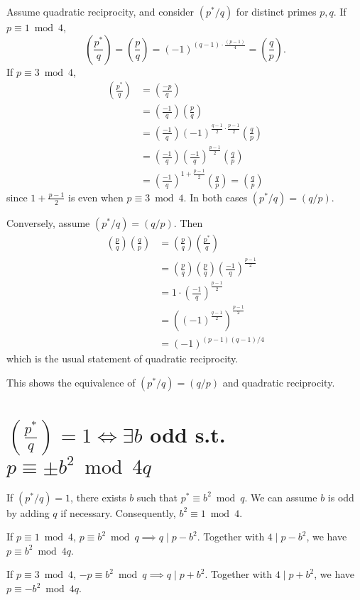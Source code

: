 \documentclass[b5paper,12pt,oneside,openright]{memoir}
\newcommand{\jacobi}[2]{\left(\frac{#1}{#2}\right)}
\begin{document}
Assume quadratic reciprocity, and consider $(p^*/q)$ for distinct primes $p, q$. If $p\equiv 1\bmod 4$,
\[\jacobi{p^*}{q} = \jacobi{p}{q} = (-1)^{(q-1)\cdot\frac{(p-1)}{4}} = \jacobi{q}{p}.\]
If $p\equiv 3\bmod 4$,
\begin{align*}
  \jacobi{p^*}{q} &= \jacobi{-p}{q}\\
                  &= \jacobi{-1}{q}\jacobi{p}{q}\\
                  &= \jacobi{-1}{q}(-1)^{\frac{q-1}{2}\cdot\frac{p-1}{2}}\jacobi{q}{p}\\
                  &= \jacobi{-1}{q}\jacobi{-1}{q}^\frac{p-1}{2}\jacobi{q}{p}\\
                  &= \jacobi{-1}{q}^{1+\frac{p-1}{2}}\jacobi{q}{p} = \jacobi{q}{p}
\end{align*}
since $1+\frac{p-1}{2}$ is even when $p\equiv 3\bmod 4$. In both cases $(p^*/q)=(q/p)$.

Conversely, assume $(p^*/q) = (q/p)$. Then
\begin{align*}
  \jacobi{p}{q}\jacobi{q}{p} &= \jacobi{p}{q}\jacobi{p^*}{q}\\
                             &= \jacobi{p}{q}\jacobi{p}{q}\jacobi{-1}{q}^\frac{p-1}{2}\\
                             &= 1\cdot\jacobi{-1}{q}^\frac{p-1}{2}\\
                             &= \left((-1)^\frac{q-1}{2}\right)^\frac{p-1}{2}\\
                             &= (-1)^{(p-1)(q-1)/4}
\end{align*}
which is the usual statement of quadratic reciprocity.

This shows the equivalence of $(p^*/q) = (q/p)$ and quadratic reciprocity.

\section{$\jacobi{p^*}{q} = 1 \iff\exists b$ odd s.t. $p\equiv\pm b^2\bmod 4q$}

If $(p^*/q) = 1$, there exists $b$ such that $p^*\equiv b^2\bmod q$. We can assume $b$ is odd by adding $q$ if necessary. Consequently, $b^2\equiv 1\bmod 4$.

If $p\equiv 1\bmod 4$, $p\equiv b^2\bmod q\implies q\mid p-b^2$. Together with $4\mid p-b^2$, we have $p\equiv b^2\bmod 4q$.


If $p\equiv 3\bmod 4$, $-p\equiv b^2\bmod q\implies q\mid p+b^2$. Together with $4\mid p+b^2$, we have $p\equiv -b^2\bmod 4q$.
\end{document}
